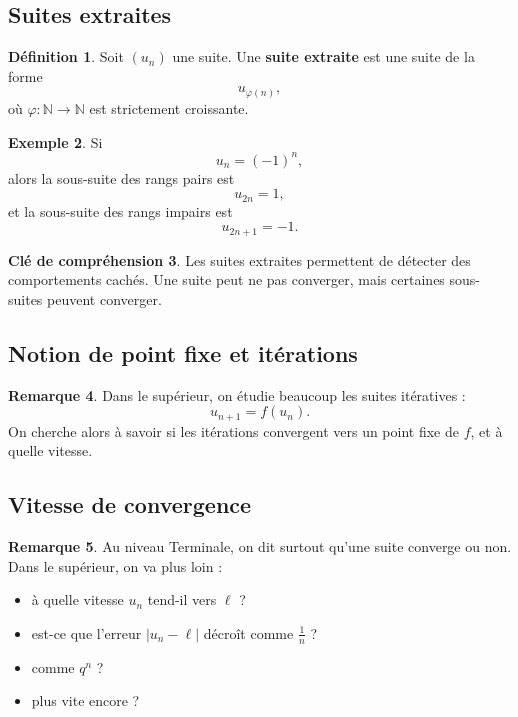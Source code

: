 \documentclass[11pt,a4paper]{article}
\theoremstyle{definition}
\newtheorem{definition}{Définition}[section]
\newtheorem{exemple}[definition]{Exemple}
\newtheorem{remarque}[definition]{Remarque}
\newtheorem{interpretation}[definition]{Clé de compréhension}
\theoremstyle{plain}
\theoremstyle{remark}
\newcommand{\N}{\mathbb{N}}
\begin{document}
\subsection{Suites extraites}

\begin{definition}
Soit $(u_n)$ une suite. Une \textbf{suite extraite} est une suite de la forme
\[
u_{\varphi(n)},
\]
où $\varphi:\N\to\N$ est strictement croissante.
\end{definition}

\begin{exemple}
Si
\[
u_n=(-1)^n,
\]
alors la sous-suite des rangs pairs est
\[
u_{2n}=1,
\]
et la sous-suite des rangs impairs est
\[
u_{2n+1}=-1.
\]
\end{exemple}

\begin{interpretation}
Les suites extraites permettent de détecter des comportements cachés. Une suite peut ne pas converger, mais certaines sous-suites peuvent converger.
\end{interpretation}

\subsection{Notion de point fixe et itérations}

\begin{remarque}
Dans le supérieur, on étudie beaucoup les suites itératives :
\[
u_{n+1}=f(u_n).
\]
On cherche alors à savoir si les itérations convergent vers un point fixe de $f$, et à quelle vitesse.
\end{remarque}

\subsection{Vitesse de convergence}

\begin{remarque}
Au niveau Terminale, on dit surtout qu'une suite converge ou non.  
Dans le supérieur, on va plus loin :
\begin{itemize}[leftmargin=0.8cm]
    \item à quelle vitesse $u_n$ tend-il vers $\ell$ ?
    \item est-ce que l'erreur $|u_n-\ell|$ décroît comme $\frac1n$ ?
    \item comme $q^n$ ?
    \item plus vite encore ?
\end{itemize}
\end{remarque}
\end{document}
